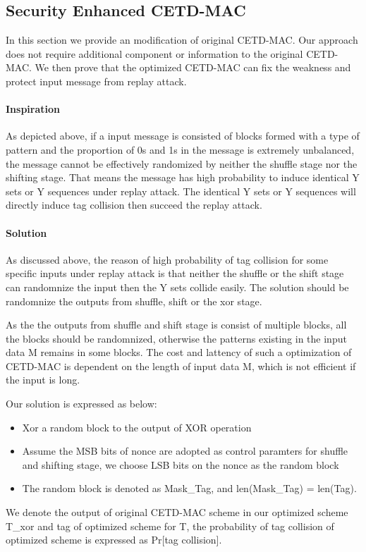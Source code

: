\documentclass{article}
\begin{document}
\subsection{Security Enhanced CETD-MAC}
In this section we provide an modification of original CETD-MAC. Our approach does not require additional component or information to the original CETD-MAC. We then prove that the optimized CETD-MAC can fix the weakness and protect input message from replay attack.
\paragraph{Inspiration}
As depicted above, if a input message is consisted of blocks formed with a type of pattern and the proportion of 0s and 1s in the message is extremely unbalanced, the message cannot be effectively randomized by neither the shuffle stage nor the shifting stage. That means the message has high probability to induce identical Y sets or Y sequences under replay attack. The identical Y sets or Y sequences will directly induce tag collision then succeed the replay attack. 
\paragraph{Solution}
As discussed above, the reason of high probability of tag collision for some specific inputs
under replay attack is that neither the shuffle or the shift stage can
randomnize the input then the Y sets collide easily. The solution should be
randomnize the outputs from shuffle, shift or the xor stage.

As the the outputs from shuffle and shift stage is consist of multiple blocks,
all the blocks should be randomnized, otherwise the patterns existing in the
input data M remains in some blocks.  
The cost and lattency of such a optimization of CETD-MAC is dependent on the
length of input data M, which is not efficient if the input is long.

Our solution is expressed as below:
\begin{itemize}
	\item Xor a random block to the output of XOR operation
	\item Assume the MSB bits of nonce are adopted as control paramters for
shuffle and shifting stage, we choose LSB bits on the nonce as the random block 
	\item The random block is denoted as Mask\_Tag, and len(Mask\_Tag) =
len(Tag).
\end{itemize}
We denote the output of original CETD-MAC scheme in our optimized scheme T\_xor
and tag of optimized scheme for T, the probability of tag collision of optimized scheme is
expressed as Pr[tag collision].  
\end{document}
